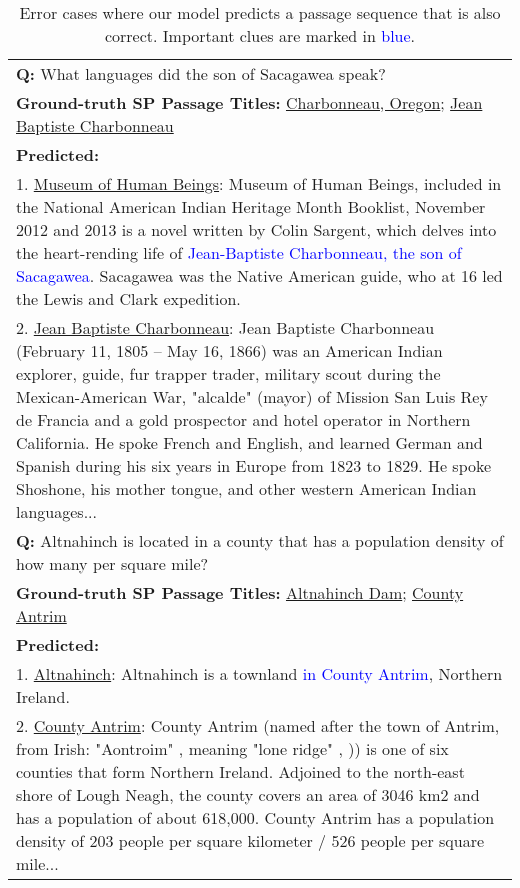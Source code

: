 \documentclass{article} \usepackage{iclr2021_conference,times}
\begin{document}
\begin{table*}[h]
    \centering
    \caption{Error cases where our model predicts a passage sequence that is also correct. Important clues are marked in \textcolor{blue}{blue}.}
    \begin{tabular}{p{}}
    \toprule
    \textbf{Q:} What languages did the son of Sacagawea speak? \\
    \textbf{Ground-truth SP Passage Titles:}  \underline{Charbonneau, Oregon}; \underline{Jean Baptiste Charbonneau}\\
    \textbf{Predicted:} \\
    1. \underline{Museum of Human Beings}: Museum of Human Beings, included in the National American Indian Heritage Month Booklist, November 2012 and 2013 is a novel written by Colin Sargent, which delves into the heart-rending life of \textcolor{blue}{Jean-Baptiste Charbonneau, the son of Sacagawea}. Sacagawea was the Native American guide, who at 16 led the Lewis and Clark expedition. \\
    2. \underline{Jean Baptiste Charbonneau}: Jean Baptiste Charbonneau (February 11, 1805 – May 16, 1866) was an American Indian explorer, guide, fur trapper trader, military scout during the Mexican-American War, "alcalde" (mayor) of Mission San Luis Rey de Francia and a gold prospector and hotel operator in Northern California. He spoke French and English, and learned German and Spanish during his six years in Europe from 1823 to 1829. He spoke Shoshone, his mother tongue, and other western American Indian languages...\\
    \midrule
    \textbf{Q:} Altnahinch is located in a county that has a population density of how many per square mile? \\
    \textbf{Ground-truth SP Passage Titles:} \underline{Altnahinch Dam}; \underline{County Antrim}\\
    \textbf{Predicted:}\\
    1. \underline{Altnahinch}: Altnahinch is a townland \textcolor{blue}{in County Antrim}, Northern Ireland.\\
    2. \underline{County Antrim}: County Antrim (named after the town of Antrim, from Irish: "Aontroim" , meaning "lone ridge" , )) is one of six counties that form Northern Ireland. Adjoined to the north-east shore of Lough Neagh, the county covers an area of 3046 km2 and has a population of about 618,000. County Antrim has a population density of 203 people per square kilometer / 526 people per square mile...\\

\end{tabular}
\end{table*}
\end{document}
